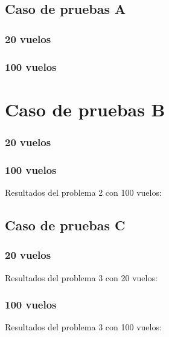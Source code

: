 \subsection{Caso de pruebas A}
\subsubsection{20 vuelos}


\subsubsection{100 vuelos}




\section{Caso de pruebas B}
\subsubsection{20 vuelos}



\subsubsection{100 vuelos}

Resultados del problema 2 con 100 vuelos:



\subsection{Caso de pruebas C}
\subsubsection{20 vuelos}

Resultados del problema 3 con 20 vuelos:

\subsubsection{100 vuelos}

Resultados del problema 3 con 100 vuelos:


